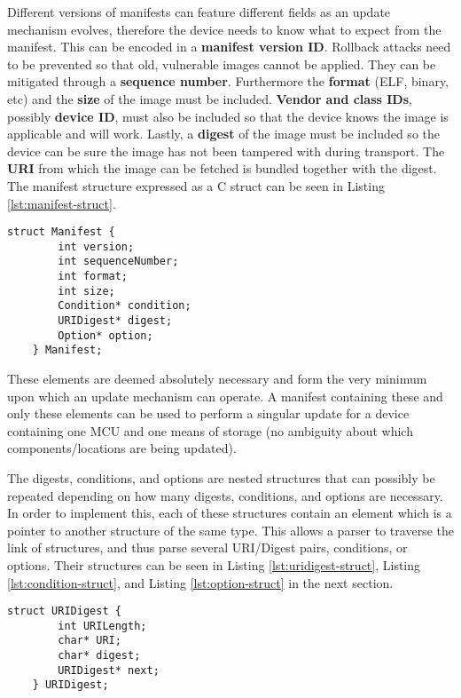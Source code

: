 \documentclass[0-thesis.tex]{subfiles}
\begin{document}
Different versions of manifests can feature different fields as an update mechanism
evolves, therefore the device needs to know what to expect from the manifest. This can be
encoded in a \textbf{manifest version ID}. Rollback attacks need to be prevented so that
old, vulnerable images cannot be applied. They can be mitigated through a \textbf{sequence
number}. Furthermore the \textbf{format} (ELF, binary, etc) and the \textbf{size} of the
image must be included. \textbf{Vendor and class IDs}, possibly \textbf{device ID}, must
also be included so that the device knows the image is applicable and will work. Lastly, a
\textbf{digest} of the image must be included so the device can be sure the image has not
been tampered with during transport. The \textbf{URI} from which the image can be fetched
is bundled together with the digest. The manifest structure expressed as a C struct can be
seen in Listing \ref{lst:manifest-struct}.

\begin{lstlisting}[language=blockc,
                    caption={The mandatory manifest format.}, 
                    label={lst:manifest-struct}]
    struct Manifest {
        int version;
        int sequenceNumber;
        int format;
        int size;
        Condition* condition;
        URIDigest* digest;
        Option* option;
    } Manifest;
\end{lstlisting}

These elements are deemed absolutely necessary and form the very minimum upon which an
update mechanism can operate. A manifest containing these and only these elements can be
used to perform a singular update for a device containing one MCU and one means of storage
(no ambiguity about which components/locations are being updated).

The digests, conditions, and options are nested structures that can possibly be repeated
depending on how many digests, conditions, and options are necessary. In order to
implement this, each of these structures contain an element which is a pointer to another
structure of the same type. This allows a parser to traverse the link of structures, and
thus parse several URI/Digest pairs, conditions, or options. Their structures can be seen
in Listing \ref{lst:uridigest-struct}, Listing \ref{lst:condition-struct}, and Listing
\ref{lst:option-struct} in the next section.

\begin{lstlisting}[language=blockc,
                    caption={The format of URI/digest pairs.}, 
                    label={lst:uridigest-struct}]
    struct URIDigest {
        int URILength;
        char* URI;
        char* digest;
        URIDigest* next;
    } URIDigest;
\end{lstlisting}
\end{document}
